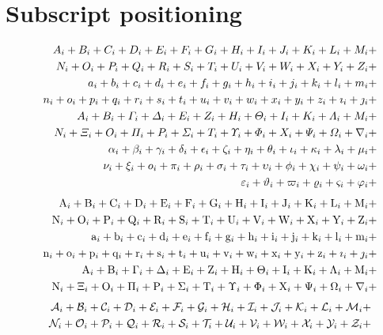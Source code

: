 \documentclass[fleqn]{article}
\def\test#1{#1}
\def\testupperi{%
  \test A \test B \test C \test D \test E \test F \test G \test H
  \test I \test J \test K \test L \test M }
\def\testupperii{%
  \test N \test O \test P \test Q \test R \test S \test T \test U
  \test V \test W \test X \test Y \test Z }
\def\testloweri{%
  \test a \test b \test c \test d \test e \test f \test g \test h
  \test i \test j \test k \test l \test m }
\def\testlowerii{%
  \test n \test o \test p \test q \test r \test s \test t \test u
  \test v \test w \test x \test y \test z 
  \test\imath \test\jmath }
\def\testupgreeki{%
  \test A \test B \test\Gamma \test\Delta \test E \test Z \test H
  \test\Theta \test I \test K \test\Lambda \test M }
\def\testupgreekii{%
  \test N \test\Xi \test O \test\Pi \test P \test\Sigma \test T
  \test\Upsilon \test\Phi \test X \test\Psi \test\Omega 
  \test\nabla }
\def\testlowgreeki{%
  \test\alpha \test\beta \test\gamma \test\delta \test\epsilon
  \test\zeta \test\eta \test\theta \test\iota \test\kappa \test\lambda
  \test\mu }
\def\testlowgreekii{%
  \test\nu \test\xi \test o \test\pi \test\rho \test\sigma \test\tau
  \test\upsilon \test\phi \test\chi \test\psi \test\omega }
\def\testlowgreekiii{%
  \test\varepsilon \test\vartheta \test\varpi \test\varrho
  \test\varsigma \test\varphi}
\begin{document}
\clearpage
\section{Subscript positioning}

\def\test#1{\mathnormal{#1}_{i}+}%
\begin{eqnarray*}
  && {\testupperi}\\
  && {\testupperii}\\
  && {\testloweri}\\ 
  && {\testlowerii}\\ 
  && {\testupgreeki}\\
  && {\testupgreekii}\\
  && {\testlowgreeki}\\
  && {\testlowgreekii}\\
  && {\testlowgreekiii}
\end{eqnarray*}%
%
\def\test#1{\mathrm{#1}_{i}+}%
\begin{eqnarray*}
  && {\testupperi}\\
  && {\testupperii}\\
  && {\testloweri}\\ 
  && {\testlowerii}\\ 
  && {\testupgreeki}\\
  && {\testupgreekii}
\end{eqnarray*}%
%
%
\def\test#1{\mathcal{#1}_{i}+}%
\begin{eqnarray*}
  && {\testupperi}\\
  && {\testupperii}
\end{eqnarray*}%
\end{document}

